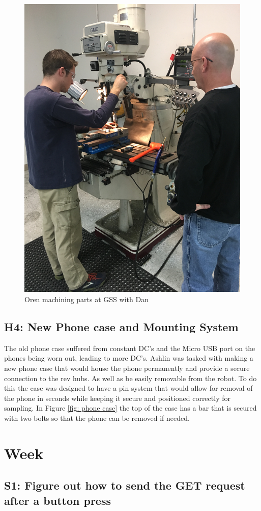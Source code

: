 \documentclass{article}
\begin{document}
\begin{figure}
    \centering
    \includegraphics[width= 0.5 \textwidth, angle=270]{25_02-18/images/machining.JPG}
    \caption{Oren machining parts at GSS with Dan}
    \label{fig: oren machining}
\end{figure}



\subsection{H4: New Phone case and  Mounting System}

The old phone case suffered from constant DC's and the Micro USB port on the phones being worn out, leading to more DC's. Ashlin was tasked with making a new phone case that would house the phone permanently and provide a secure connection to the rev hubs. As well as be easily removable from the robot. To do this the case was designed to have a pin system that would allow for removal of the phone in seconds while keeping it secure and positioned correctly for sampling. In Figure \ref{fig: phone case} the top of the case has a bar that is secured with two bolts so that the phone can be removed if needed.
\clearpage \newpage \section{Week \thesection} 
\subsection{S1: Figure out how to send the GET request after a button press}
\end{document}

